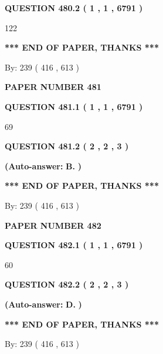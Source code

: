 \documentclass[12pt]{article}
\begin{document}
  
{\textbf{\large{QUESTION
480.2 
 ( 1 , 1 , 6791 )
}}}

122
   
   
   
   
\vspace{1.0in} 
{\textbf{\large{ *** END OF PAPER, THANKS *** }}} 
   
   
\hspace{1.0in} By: 
 239 ( 416 ,  613 )
   
   
   
   
\newpage 
\setcounter{page}{ 
   481001 } 
   
   
 {\textbf{ \Large{ PAPER NUMBER  481  }}}
   
   
   
   
  
  
{\textbf{\large{QUESTION
481.1 
 ( 1 , 1 , 6791 )
}}}

69
  
  
{\textbf{\large{QUESTION
481.2 
 ( 2 , 2 , 3 )
}}}
 
 
{\textbf{(Auto-answer:}}
{\textbf{\large{
B.}}}
{\textbf{)}}
 
 
   
   
   
   
\vspace{1.0in} 
{\textbf{\large{ *** END OF PAPER, THANKS *** }}} 
   
   
\hspace{1.0in} By: 
 239 ( 416 ,  613 )
   
   
   
   
\newpage 
\setcounter{page}{ 
   482001 } 
   
   
 {\textbf{ \Large{ PAPER NUMBER  482  }}}
   
   
   
   
  
  
{\textbf{\large{QUESTION
482.1 
 ( 1 , 1 , 6791 )
}}}

60
  
  
{\textbf{\large{QUESTION
482.2 
 ( 2 , 2 , 3 )
}}}
 
 
{\textbf{(Auto-answer:}}
{\textbf{\large{
D.}}}
{\textbf{)}}
 
 
   
   
   
   
\vspace{1.0in} 
{\textbf{\large{ *** END OF PAPER, THANKS *** }}} 
   
   
\hspace{1.0in} By: 
 239 ( 416 ,  613 )
   
   
   
\end{document}
